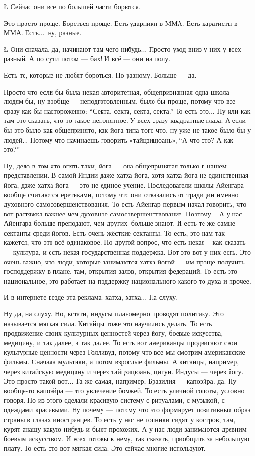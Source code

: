 \L
Сейчас они все по большей части
борются.

\A
Это просто проще.
Бороться проще.
Есть ударники в ММА.
Есть каратисты в ММА.
Есть...\ ну, разные.

\L
Они сначала, да, начинают там чего-нибудь...
Просто уход вниз у них у всех разный.
А по сути потом --- бах!
И всё --- они на полу.

\A
Есть те, которые не любят бороться.
По разному.
Больше --- да.

\I
Просто что
если бы была некая
авторитетная, общепризнанная
одна школа,
людям бы, ну вообще --- неподготовленным,
было бы проще,
потому что все сразу
как-бы настороженно:
``Секта, секта, секта, секта.''
То есть это...
Ну или как там это сказать,
что-то такое непонятное.
У всех сразу квадратные глаза.
А если бы это было
как общепринято,
как йога
типа того что,
ну уже не такое было бы у людей...
Потому что начинаешь говорить
«тайцзицюань»,
``А что это?
А как это?''

\A
Ну, дело в том что опять-таки,
йога --- она общепринятая
только в нашем представлении.
В самой Индии
даже хатха-йога,
хотя хатха-йога
не единственная йога,
даже хатха-йога --- это не единое учение.
Последователи школы Айенгара
вообще считаются еретиками,
потому что они отказались
от традиции
именно духовного самосовершенствования.
То есть Айенгар
первым начал говорить,
что вот растяжка важнее
чем духовное самосовершенствование.
Поэтому...
А у нас
Айенгара больше преподают,
чем других,
больше знают.
И есть те же самые сектанты
среди йогов.
Есть очень жёсткие сектанты.
То есть,
это нам так кажется,
что это всё одинаковое.
Но другой вопрос,
что есть некая
-- как сказать ---
культура, и есть некая
государственная поддержка.
Вот это вот у них есть.
Это очень важно, что
люди, которые занимаются
хатха-йогой ---
им проще получить
господдержку
в плане, там, открытия залов,
открытия федераций.
То есть это
национальное,
это работает на поддержку
национального какого-то духа
и прочее.

\I
И в интернете везде эта
реклама: хатха, хатха...
На слуху.

\A
Ну да, на слуху.
Но, кстати, индусы
планомерно проводят политику.
Это называется мягкая сила.
Китайцы тоже это научились делать.
То есть продвижение
своих культурных ценностей
через йогу,
боевые искусства,
медицину, и так далее, и так далее.
То есть вот американцы
продвигают свои культурные ценности
через Голливуд,
потому что все мы смотрим
американские фильмы.
Сначала мультики,
а потом взрослые фильмы.
А китайцы, например,
через китайскую медицину
и через тайцзицюань, цигун.
Индусы --- через йогу.
Это просто
такой вот...
Та же самая,
например,
Бразилия ---
капоэйра,
да.
Ну вообще-то
капоэйра --- это
увлечение бомжей.
То есть
уличной гопоты,
условно говоря.
Но из этого сделали
красивую систему
с ритуалами,
с музыкой,
с одеждами красивыми.
Ну почему ---
потому что
это
формирует позитивный образ страны
в глазах иностранцев.
То есть у нас не гопники
сидят у костров,
там, курят
анашу какую-нибудь
и бьют прохожих.
А у нас люди занимаются
древним боевым искусством.
И всех готовы к нему,
так сказать,
приобщить за небольшую плату.
То есть это вот
мягкая сила.
Это сейчас многие используют.

